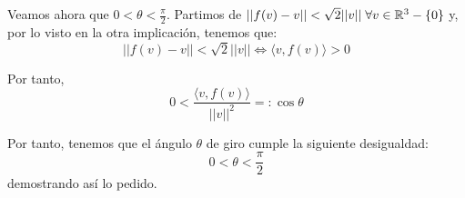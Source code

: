 \begin{ejercicio}
\begin{description}
        Veamos ahora que $0< \theta < \frac{\pi}{2}$. Partimos de $||f(v)-v|| < \sqrt{2}||v||\;\forall v\in \mathbb{R}^3-\{0\}$ y, por lo visto en la otra implicación, tenemos que:
        \begin{equation*}
            ||f(v)-v|| < \sqrt{2}||v|| \Longleftrightarrow
            \langle v,f(v)\rangle >0
        \end{equation*}

        Por tanto,
        \begin{equation*}
            0 < \frac{\langle v,f(v)\rangle}{||v||^2} =: \cos \theta
        \end{equation*}

        Por tanto, tenemos que el ángulo $\theta$ de giro cumple la siguiente desigualdad:
        \begin{equation*}
            0 < \theta < \frac{\pi}{2}
        \end{equation*}
        demostrando así lo pedido.
    \end{description}
\end{ejercicio}



